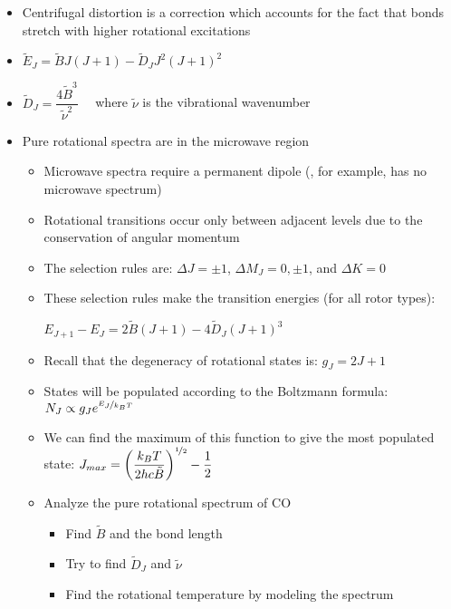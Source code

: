 \documentclass[12pt, openany, letterpaper]{memoir}
\begin{document}
\begin{itemize}
\begin{itemize}
	\end{itemize}
	\item Centrifugal distortion is a correction which accounts for the fact that bonds stretch with higher rotational excitations
	\item $\tilde{E}_J = \tilde{B}J(J+1)-\tilde{D}_J J^2(J+1)^2$ 
	\item $\tilde{D}_J = \dfrac{4\tilde{B}^3}{\tilde{\nu}^2}$ ~~where $\tilde{\nu}$ is the vibrational wavenumber
	\item Pure rotational spectra are in the microwave region
	\begin{itemize}
		\item Microwave spectra require a permanent dipole (, for example, has no microwave spectrum)
		\item Rotational transitions occur only between adjacent levels due to the conservation of angular momentum
		\item The selection rules are: $\Delta J=\pm 1$, $\Delta M_J=0,\pm1$, and $\Delta K=0$
		\item These selection rules make the transition energies (for all rotor types): 
		
		$E_{J+1}-E_J = 2\tilde{B}(J+1) - 4\tilde{D}_J(J+1)^3$
		\item Recall that the degeneracy of rotational states is: $g_J=2J+1$		
		\item States will be populated according to the Boltzmann formula: $N_J\propto g_Je^{\nicefrac{E_J}{k_BT}}$
		\item We can find the maximum of this function to give the most populated state: $J_{max}=\left(\dfrac{k_BT}{2hc\tilde{B}}\right)^{\nicefrac{1}{2}}-\dfrac{1}{2}$
		\item Analyze the pure rotational spectrum of CO
		\begin{itemize}
			\item Find $\tilde{B}$ and the bond length
			\item Try to find $\tilde{D}_J$ and $\tilde{\nu}$
			\item Find the rotational temperature by modeling the spectrum
		\end{itemize}
	\end{itemize}
\end{itemize}
\end{document}
